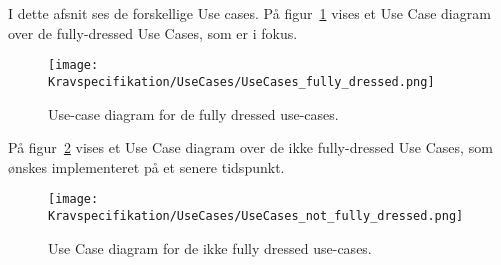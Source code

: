 \label{sec:krav_usecases}
I dette afsnit ses de forskellige Use cases. På figur~\ref{fig:fullydressedusecases} vises et Use Case diagram over de fully-dressed Use Cases, som er i fokus. 
\begin{figure}[H]
	\centering
	\texttt{[image: Kravspecifikation/UseCases/UseCases\_fully\_dressed.png]}
	\caption{Use-case diagram for de fully dressed use-cases.}
	\label{fig:fullydressedusecases}
\end{figure}

På figur~\ref{fig:ikkefullydressedusecases} vises et Use Case diagram over de ikke fully-dressed Use Cases, som ønskes implementeret på et senere tidspunkt.

\begin{figure}[H]
	\centering
	\texttt{[image: Kravspecifikation/UseCases/UseCases\_not\_fully\_dressed.png]}
	\caption{Use Case diagram for de ikke fully dressed use-cases.}
	\label{fig:ikkefullydressedusecases}
\end{figure}

\newpage

\newpage		

\newpage

\newpage

\newpage

\newpage

\newpage

\newpage

